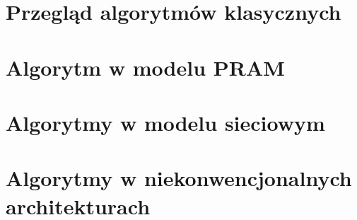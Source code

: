 \section{Przegląd algorytmów klasycznych}


\section{Algorytm w modelu PRAM}


\section{Algorytmy w modelu sieciowym}


\section{Algorytmy w niekonwencjonalnych architekturach}
